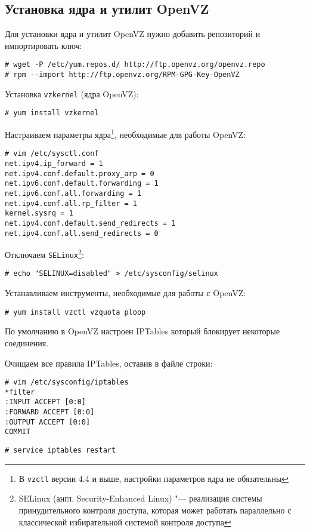 \subsection{Установка ядра и утилит OpenVZ}
Для установки ядра и утилит OpenVZ нужно добавить репозиторий и импортировать ключ:
\begin{lstlisting}
# wget -P /etc/yum.repos.d/ http://ftp.openvz.org/openvz.repo
# rpm --import http://ftp.openvz.org/RPM-GPG-Key-OpenVZ
\end{lstlisting}

Установка \texttt{vzkernel} (ядра OpenVZ):
\begin{lstlisting}
# yum install vzkernel
\end{lstlisting}

Настраиваем параметры ядра\footnote{В \texttt{vzctl} версии 4.4 и выше, настройки параметров ядра не обязательны}, необходимые для работы OpenVZ:
\begin{lstlisting}
# vim /etc/sysctl.conf
net.ipv4.ip_forward = 1
net.ipv4.conf.default.proxy_arp = 0
net.ipv6.conf.default.forwarding = 1
net.ipv6.conf.all.forwarding = 1
net.ipv4.conf.all.rp_filter = 1
kernel.sysrq = 1
net.ipv4.conf.default.send_redirects = 1
net.ipv4.conf.all.send_redirects = 0
\end{lstlisting}

Отключаем \texttt{SELinux}\footnote{SELinux (англ. Security-Enhanced Linux) "--- реализация системы принудительного контроля доступа, которая может работать параллельно с классической избирательной системой контроля доступа}:
\begin{lstlisting}
# echo "SELINUX=disabled" > /etc/sysconfig/selinux
\end{lstlisting}

Устанавливаем инструменты, необходимые для работы с OpenVZ:
\begin{lstlisting}
# yum install vzctl vzquota ploop
\end{lstlisting}

По умолчанию в OpenVZ настроен IPTables который блокирует некоторые соединения.

Очищаем все правила IPTables, оставив в файле строки:
\begin{lstlisting}
# vim /etc/sysconfig/iptables
*filter
:INPUT ACCEPT [0:0]
:FORWARD ACCEPT [0:0]
:OUTPUT ACCEPT [0:0]
COMMIT
\end{lstlisting}
\begin{lstlisting}
# service iptables restart
\end{lstlisting}

